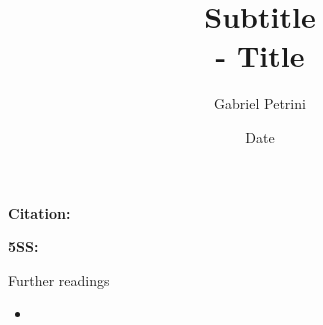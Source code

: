\documentclass[11pt,lineno]{../_configs}
\title{
\large{Subtitle}\vspace{2pt}\\
\Huge{\autor - Title}
}
\date{Date}
\author[$\ast$]{Gabriel Petrini}
\affil[$\ast$]{PhD Student at Unicamp.}
\newcommand{\autor}{\textcite{key} }
\begin{document}
\maketitle
\articletypemark
\marginmark
\thispagestyle{firststyle}

\noindent \textbf{Citation:} 	

\begin{infobox}
	\textbf{5SS:} \autor 
\end{infobox}

\begin{redbox}{Further readings}
	\begin{itemize}
		\item 
	\end{itemize}
\end{redbox}

\printbibliography
	
\end{document}
